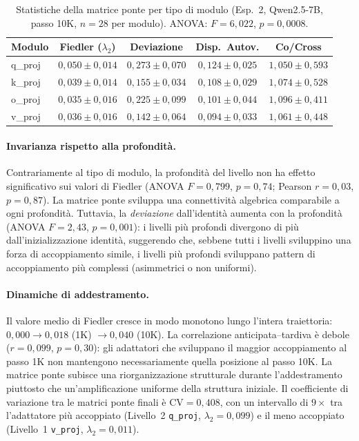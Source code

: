 \documentclass[11pt]{article}
\begin{document}
\begin{table}[t]
\centering
\caption{Statistiche della matrice ponte per tipo di modulo (Esp.\ 2,
Qwen2.5-7B, passo 10K, $n = 28$ per modulo). ANOVA: $F = 6{,}022$,
$p = 0{,}0008$.}
\label{tab:module-anatomy}
\small
\begin{tabular}{@{}lcccc@{}}
\toprule
Modulo & Fiedler ($\lambda_2$) & Deviazione & Disp.\ Autov. & Co/Cross \\
\midrule
q\_proj & $0{,}050 \pm 0{,}014$ & $0{,}273 \pm 0{,}070$ & $0{,}124 \pm 0{,}025$ & $1{,}050 \pm 0{,}593$ \\
k\_proj & $0{,}039 \pm 0{,}014$ & $0{,}155 \pm 0{,}034$ & $0{,}108 \pm 0{,}029$ & $1{,}074 \pm 0{,}528$ \\
o\_proj & $0{,}035 \pm 0{,}016$ & $0{,}225 \pm 0{,}099$ & $0{,}101 \pm 0{,}044$ & $1{,}096 \pm 0{,}411$ \\
v\_proj & $0{,}036 \pm 0{,}016$ & $0{,}142 \pm 0{,}064$ & $0{,}094 \pm 0{,}033$ & $1{,}061 \pm 0{,}448$ \\
\bottomrule
\end{tabular}
\end{table}

\paragraph{Invarianza rispetto alla profondit\`a.}
Contrariamente al tipo di modulo, la profondit\`a del livello non ha
effetto significativo sui valori di Fiedler (ANOVA $F = 0{,}799$,
$p = 0{,}74$; Pearson $r = 0{,}03$, $p = 0{,}87$).
La matrice ponte sviluppa una connettivit\`a algebrica comparabile a
ogni profondit\`a. Tuttavia, la \emph{deviazione} dall'identit\`a
aumenta con la profondit\`a (ANOVA $F = 2{,}43$, $p = 0{,}001$): i
livelli pi\`u profondi divergono di pi\`u dall'inizializzazione
identit\`a, suggerendo che, sebbene tutti i livelli sviluppino una forza
di accoppiamento simile, i livelli pi\`u profondi sviluppano pattern di
accoppiamento pi\`u complessi (asimmetrici o non uniformi).

\paragraph{Dinamiche di addestramento.}
Il valore medio di Fiedler cresce in modo monotono lungo l'intera
traiettoria: $0{,}000 \to 0{,}018$ (1K) $\to 0{,}040$ (10K). La
correlazione anticipata--tardiva \`e debole ($r = 0{,}099$,
$p = 0{,}30$): gli adattatori che sviluppano il maggior accoppiamento
al passo 1K non mantengono necessariamente quella posizione al passo
10K. La matrice ponte subisce una riorganizzazione strutturale durante
l'addestramento piuttosto che un'amplificazione uniforme della struttura
iniziale. Il coefficiente di variazione tra le matrici ponte finali \`e
$\text{CV} = 0{,}408$, con un intervallo di $9\times$ tra l'adattatore
pi\`u accoppiato (Livello~2 \texttt{q\_proj}, $\lambda_2 = 0{,}099$) e
il meno accoppiato (Livello~1 \texttt{v\_proj},
$\lambda_2 = 0{,}011$).
\end{document}
